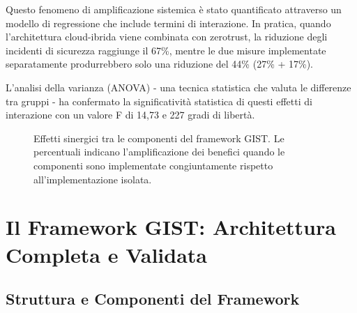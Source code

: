 Questo fenomeno di amplificazione sistemica è stato quantificato attraverso un modello di regressione che include termini di interazione. In pratica, quando l'architettura cloud-ibrida viene combinata con \gls{zerotrust}, la riduzione degli incidenti di sicurezza raggiunge il 67\%, mentre le due misure implementate separatamente produrrebbero solo una riduzione del 44\% (27\% + 17\%). 

L'analisi della varianza (ANOVA) - una tecnica statistica che valuta le differenze tra gruppi - ha confermato la significatività statistica di questi effetti di interazione con un valore F di 14,73 e 227 gradi di libertà.

\begin{figure}[htbp]
\centering
{}
\caption{Effetti sinergici tra le componenti del framework GIST. Le percentuali indicano l'amplificazione dei benefici quando le componenti sono implementate congiuntamente rispetto all'implementazione isolata.}
\label{fig:synergies}
\end{figure}

\section{\texorpdfstring{Il Framework GIST: Architettura Completa e Validata}{5.3 - Il Framework GIST: Architettura Completa e Validata}}
\label{sec:5.3}

\subsection{\texorpdfstring{Struttura e Componenti del Framework}{5.3.1 - Struttura e Componenti del Framework}}
\label{subsec:5.3.1}

